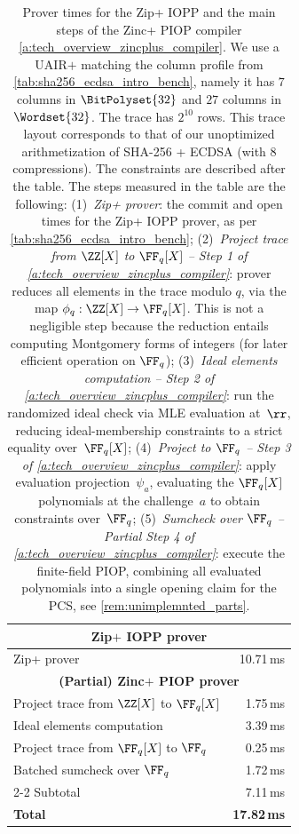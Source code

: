 \begin{table}[H]
\centering

\begin{tabular}{ l r}
\toprule
 \multicolumn{2}{c}{\textbf{Zip$+$ IOPP prover}} \\
\midrule
 Zip+ prover          & 10.71\,ms \\
\midrule
 \multicolumn{2}{c}{\textbf{(Partial) Zinc$+$ PIOP prover}} \\
\midrule
 Project trace from $\ZZ[X]$ to $\FF_q[X]$ &  1.75\,ms \\
 Ideal elements computation        &  3.39\,ms \\
 Project trace from $\FF_q[X]$ to $\FF_q$      & 0.25\,ms \\
 Batched sumcheck over $\FF_q$    &  1.72\,ms \\
\cmidrule{2-2}
 Subtotal & 7.11\,ms \\
\midrule
 \textbf{Total}      & \textbf{17.82\,ms} \\
\bottomrule
\end{tabular}
\caption{%
Prover times for the Zip+ IOPP and the main steps of the Zinc+ PIOP compiler \cref{a:tech_overview_zincplus_compiler}. We use a UAIR$+$ matching the column profile from \cref{tab:sha256_ecdsa_intro_bench}, namely it has $7$ columns in $\BitPolyset{32}$ and $27$ columns in $\Wordset{32}$. The trace has $2^{10}$ rows.  This trace layout corresponds to that of our unoptimized arithmetization of SHA-256 + ECDSA (with $8$ compressions). The constraints are described after the table. 
%
\newline
The steps measured in the table are the following: 
(1)~\emph{Zip+ prover}: the commit and open times for the Zip+ IOPP prover, as per \cref{tab:sha256_ecdsa_intro_bench};
(2)~\emph{Project trace from $\ZZ[X]$ to $\FF_q[X]$ -- Step 1 of \cref{a:tech_overview_zincplus_compiler}}: prover reduces all elements in the trace modulo $q$, via the map $\phi_q: \ZZ[X]\to \FF_q[X]$. This is not a negligible step because the reduction entails computing Montgomery forms of integers (for later efficient operation on $\FF_q$);  
(3)~\emph{Ideal elements computation -- Step 2 of \cref{a:tech_overview_zincplus_compiler}}: run the randomized ideal check via MLE evaluation at~$\rr$, reducing ideal-membership constraints to a strict equality over~$\FF_q[X]$;
(4)~\emph{Project to $\FF_q$ -- Step 3 of \cref{a:tech_overview_zincplus_compiler}}: apply evaluation projection~$\psi_a$, evaluating the $\FF_q[X]$ polynomials at the challenge~$a$ to obtain constraints over~$\FF_q$;
(5)~\emph{Sumcheck over $\FF_q$ -- Partial Step 4 of \cref{a:tech_overview_zincplus_compiler}}: execute the finite-field PIOP, combining all evaluated polynomials into a single opening claim for the PCS, see \cref{rem:unimplemnted_parts}.
}
\label{tab:sha256-snark-steps}
\end{table}

